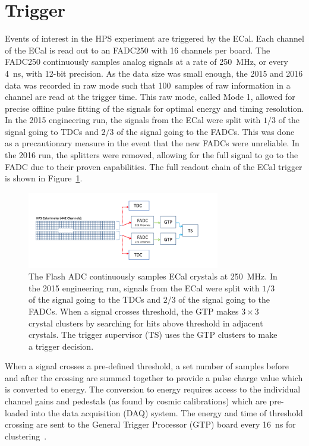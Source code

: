 \section{Trigger}
Events of interest in the HPS experiment are triggered by the ECal. Each channel of the ECal is read out to an FADC250 with 16 channels per board. The FADC250 continuously samples analog signals at a rate of 250~MHz, or every 4~ns, with 12-bit precision. As the data size was small enough, the 2015 and 2016 data was recorded in raw mode such that 100~samples of raw information in a channel are read at the trigger time. This raw mode, called Mode 1, allowed for precise offline pulse fitting of the signals for optimal energy and timing resolution. In the 2015 engineering run, the signals from the ECal were split with $1/3$ of the signal going to TDCs and $2/3$ of the signal going to the FADCs. This was done as a precautionary measure in the event that the new FADCs were unreliable. In the 2016 run, the splitters were removed, allowing for the full signal to go to the FADC due to their proven capabilities. The full readout chain of the ECal trigger is shown in Figure~\ref{Figure:readoutChain}.
\begin{figure}[thb]
  \centering
      \includegraphics[width=0.75\textwidth]{pics/experiment/readoutChain.png}
  \caption[ECal readout chain]{The Flash ADC continuously samples ECal crystals at 250~MHz. In the 2015 engineering run, signals from the ECal were split with $1/3$ of the signal going to the TDCs and $2/3$ of the signal going to the FADCs. When a signal crosses threshold, the GTP makes $3\times3$ crystal clusters by searching for hits above threshold in adjacent crystals. The trigger supervisor (TS) uses the GTP clusters to make a trigger decision.}
  \label{Figure:readoutChain}
\end{figure}
When a signal crosses a pre-defined threshold, a set number of samples before and after the crossing are summed together to provide a pulse charge value which is converted to energy. The conversion to energy requires access to the individual channel gains and pedestals (as found by cosmic calibrations) which are pre-loaded into the data acquisition (DAQ) system. The energy and time of threshold crossing are sent to the General Trigger Processor (GTP) board every 16~ns  for clustering~\cite{balossino_hps_2016}.\\
